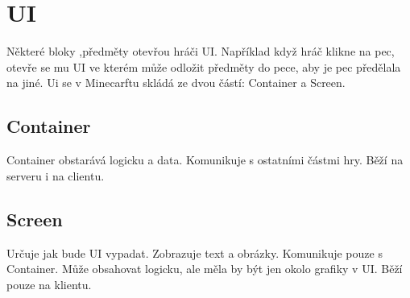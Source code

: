 \documentclass[FM,RP]{tulthesis}
\begin{document}
\section{UI}
Některé bloky ,předměty otevřou hráči UI. Například když hráč klikne na pec, otevře se mu UI ve kterém může odložit předměty do pece, aby je pec předělala na jiné. Ui se v Minecarftu skládá ze dvou částí: Container a Screen.
\subsection{Container}
Container obstarává logicku a data. Komunikuje s ostatními částmi hry. Běží na serveru i na  clientu.
\subsection{Screen}
Určuje jak bude UI vypadat. Zobrazuje text a obrázky. Komunikuje pouze s Container. Může obsahovat logicku, ale měla by být jen okolo grafiky v UI. Běží pouze na klientu.
\end{document}

